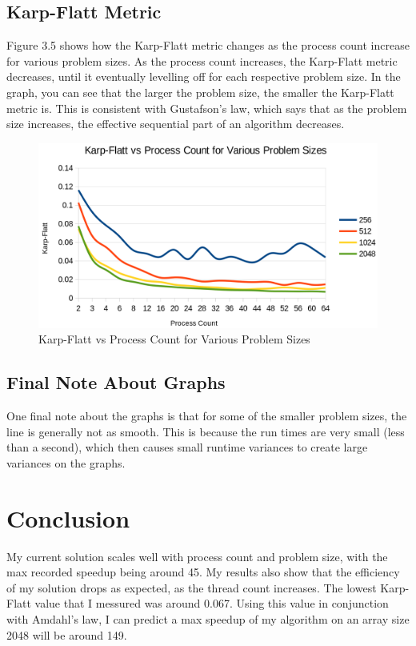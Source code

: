 \documentclass{report}
\begin{document}
\section{Karp-Flatt Metric}
Figure 3.5 shows how the Karp-Flatt metric changes as the process count increase for various problem sizes. As the process count increases, the Karp-Flatt metric decreases, until it eventually levelling off for each respective problem size. In the graph, you can see that the larger the problem size, the smaller the Karp-Flatt metric is. This is consistent with Gustafson's law, which says that as the problem size increases, the effective sequential part of an algorithm decreases. 
\begin{figure}[h]

\includegraphics[width=1\textwidth]{Karp-Flatt}
\caption{Karp-Flatt vs Process Count for Various Problem Sizes}
\label{fig:subim3}
\end{figure}

\section{Final Note About Graphs}
One final note about the graphs is that for some of the smaller problem sizes, the line is generally not as smooth. This is because the run times are very small (less than a second), which then causes small runtime variances to create large variances on the graphs.

\chapter{Conclusion}
My current solution scales well with process count and problem size, with the max recorded speedup being around 45. My results also show that the efficiency of my solution drops as expected, as the thread count increases. The lowest Karp-Flatt value that I messured was around 0.067. Using this value in conjunction with Amdahl's law, I can predict a max speedup of my algorithm on an array size 2048 will be around 149.
\end{document}
